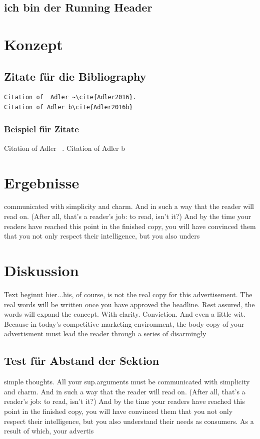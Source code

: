 \documentclass{like}
\begin{document}
	
\section{ich bin der Running Header}
	




\chapter{Konzept}


	\section{Zitate für die Bibliography}
	\begin{verbatim}
Citation of  Adler ~\cite{Adler2016}.
Citation of Adler b\cite{Adler2016b}
	\end{verbatim}
	\subsection{Beispiel für Zitate}
Citation of  Adler ~\cite{Adler2016}.
Citation of Adler b\cite{Adler2016b}

\chapter{Ergebnisse}

communicated with simplicity and charm. And in such a way that the reader will read on. (After all, that’s a reader’s job: to read, isn’t it?) And by the time your readers have reached this point in the finished copy, you will have convinced them that you not only respect their intelligence, but you also unders




\chapter{Diskussion}
Text beginnt hier...his, of course, is not the real copy for this advertisement. The real words will be written once you have approved the headline. Rest assured, the words will expand the concept. With clarity. Conviction. And even a little wit. Because in today’s competitive marketing environment, the body copy of your advertisment must lead the reader through a series of disarmingly 
\section{Test für Abstand der Sektion} 
simple thoughts. All your \ac{sup.}arguments must be communicated with simplicity and charm. And in such a way that the reader will read on. (After all, that’s a reader’s job: to read, isn’t it?) And by the time your readers have reached this point in the finished copy, you will have convinced them that you not only respect their intelligence, but you also understand their needs as consumers. As a result of which, your advertis
\end{document}

